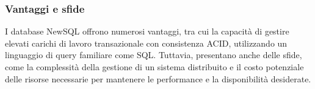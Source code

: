 \documentclass{article}
\begin{document}
\subsubsection{Vantaggi e sfide}
I database NewSQL offrono numerosi vantaggi, tra cui la capacità di gestire elevati carichi di lavoro transazionale con consistenza ACID, utilizzando un linguaggio di query familiare come SQL. Tuttavia, presentano anche delle sfide, come la complessità della gestione di un sistema distribuito e il costo potenziale delle risorse necessarie per mantenere le performance e la disponibilità desiderate.
\end{document}
